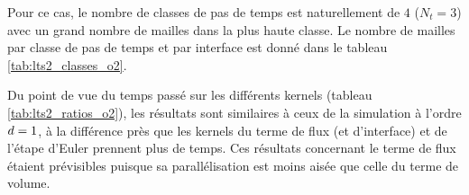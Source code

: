 Pour ce cas, le nombre de classes de pas de temps est naturellement de $4$
($N_t=3$) avec un grand nombre de mailles dans la plus haute classe.
Le nombre de mailles par classe de pas de temps et par interface est
donné dans le tableau \ref{tab:lts2_classes_o2}.

Du point de vue du temps passé sur les différents kernels
(tableau \ref{tab:lts2_ratios_o2}), les résultats sont similaires
à ceux de la simulation à l'ordre $d=1$, à la différence près
que les kernels du terme de flux (et d'interface) et de l'étape d'Euler
prennent plus de temps.
Ces résultats concernant le terme de flux étaient prévisibles
puisque sa parallélisation est moins aisée que celle du terme de volume.
\\






